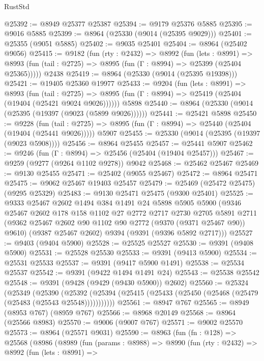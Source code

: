 \begin{lexlean}{RustStd}
\begin{coremodule}
@25392 := @8949 @25377 @25387
@25394 := @9179 @25376 @5885
@25395 := @9016 @5885
@25399 := @8964 (@25330 (@9014 (@25395 @9029)))
@25401 := @25355 (@9051 @5885)
@25402 := @9035 @25401
@25404 := @8964 (@25402 @9056)
@25415 := @9182
    (fun (rty : @2432) =>
    @8992
      (fun (lets : @8991) =>
      @8993 (fun (tail : @2725) => @8995 (fun (Γ : @8994) => @25399 (@25404 @25365)))))
    @2438
@25419 := @8964 (@25330 (@9014 (@25395 @19398)))
@25421 := @19405 @25360 @19977
@25433 := @9204
    (fun (lets : @8991) =>
    @8993
      (fun (tail : @2725) =>
      @8995 (fun (Γ : @8994) => @25419 (@25404 (@19404 (@25421 @9024 @9026))))))
    @5898
@25440 := @8964 (@25330 (@9014 (@25395 (@19397 (@9023 (@5899 @9026))))))
@25441 := @25421 @5898
@25450 := @9228
    (fun (tail : @2725) => @8995 (fun (Γ : @8994) => @25440 (@25404 (@19404 (@25441 @9026)))))
    @5907
@25455 := @25330 (@9014 (@25395 (@19397 (@9023 @5908))))
@25456 := @8964 @25455
@25457 := @25441 @5907
@25462 := @9246 (fun (Γ : @8994) => @25456 (@25404 (@19404 @25457)))
@25467 := @9259 (@9277 (@9264 @1102 @9278)) @9042
@25468 := @25462 @25467
@25469 := @9130 @25455
@25471 := @25402 (@9055 @25467)
@25472 := @8964 @25471
@25475 := @9062 @25467 @19403 @25457
@25479 := @25469 (@25472 @25475) (@9295 @25329)
@25483 := @9130 @25471 @25475 (@9300 @25401)
@25525 := @9333
    @25467
    @2602
    @1494
    @384
    @1491
    @24
    @5898
    @5905
    @5900
    (@9346
      @25467
      @2602
      @178
      @158
      @1102
      @27
      @2772
      @2717
      @2730
      @2705
      @5891
      @2711
      (@9362 @25467 @2602 @90 @1102 @90 @2772 (@9370 (@9371 @25467 @90)) @9610)
      (@9387 @25467 @2602)
      @9394
      (@9391 (@9396 @5892 @2717)))
@25527 := @9403 (@9404 @5900)
@25528 := @25525 @25527
@25530 := @9391 (@9408 @5900)
@25531 := @25528 @25530
@25533 := @9391 (@9413 @5900)
@25534 := @25531 @25533
@25537 := @9391 (@9417 @5900 @1491)
@25538 := @25534 @25537
@25542 := @9391 (@9422 @1494 @1491 @24)
@25543 := @25538 @25542
@25548 := @9391 (@9428 (@9429 (@9430 @5900)) @2602)
@25560 := @25324
    (@25349
      (@25390
        (@25392 (@25394 (@25415 (@25433 (@25450 (@25468 (@25479 (@25483 (@25543 @25548)))))))))))
@25561 := @8947 @767
@25565 := @8949 (@8953 @767) (@8959 @767)
@25566 := @8968 @20149
@25568 := @8964 (@25566 @8983)
@25570 := @9006 (@9007 @767)
@25571 := @9002 @25570
@25573 := @8964 (@25571 @9031)
@25590 := @8963
    (fun (fn : @128) =>
    @25568
      (@8986
        (@8989
          (fun (params : @8988) =>
          @8990
            (fun (rty : @2432) =>
            @8992
              (fun (lets : @8991) =>

\end{coremodule}
\end{lexlean}
